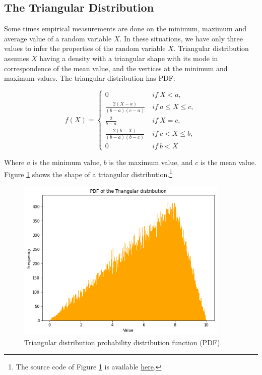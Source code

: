 \subsection{The Triangular Distribution}
Some times empirical measurements are done on the minimum, maximum and average value of a random variable $X$. In these situations, we have only three values to infer the properties of the random variable $X$. Triangular distribution assumes $X$ having a density with a triangular shape with its mode in correspondence of the mean value, and the vertices at the minimum and maximum values. The triangular distribution has PDF:

\begin{equation}
f(X)=\left\{
                \begin{array}{ll}
                  0\ \ & if\ X<a,\\
                  \frac{2(X-a)}{(b-a)(c-a)}\ & if\ a\le X\le c,\\
                  \frac{2}{b-a}\ & if\ X=c,\\
                  \frac{2(b-X)}{(b-a)(b-c)}\ & if\ c<X\le b,\\
                  0\ & if\ b<X
                \end{array}
              \right.
\label{eq_triangularDF}
\end{equation}

Where $a$ is the minimum value, $b$ is the maximum value, and $c$ is the mean value. Figure \ref{fig_triangular} shows the shape of a triangular distribution.\footnote{The source code of Figure \ref{fig_triangular} is available \href{https://github.com/aletuf93/logproj/blob/master/examples/03.\%20Statistics.ipynb}{here}.
}

\begin{figure}[hbt!]
\centering
\includegraphics[width=0.9\textwidth]{SectionLetsMath/elemStat_figures/fig_triangular.png}
\captionsetup{type=figure}
\caption{Triangular distribution probability distribution function (PDF).}
\label{fig_triangular}
\end{figure}

